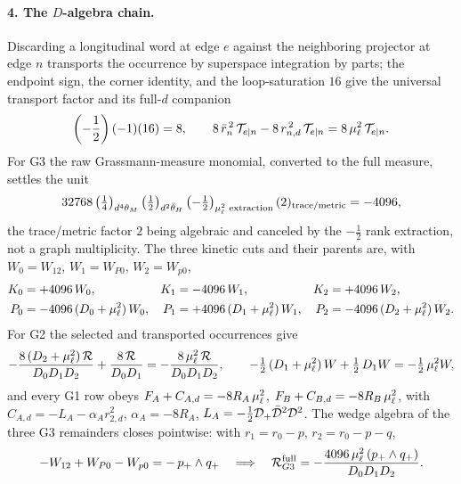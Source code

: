 \paragraph{4. The $D$-algebra chain.} Discarding a longitudinal word at edge $e$ against the neighboring projector at edge $n$ transports the occurrence by superspace integration by parts; the endpoint sign, the corner identity, and the loop-saturation $16$ give the universal transport factor and its full-$d$ companion
\begin{equation}\label{eq:ss:ab:transport}
\left(-\frac12\right)(-1)(16)=8,
\qquad
8\,\bar r_n^{\,2}\,\mathcal T_{e|n}-8\,r_{n,d}^{\,2}\,\mathcal T_{e|n}
=8\,\mu_\ell^{2}\,\mathcal T_{e|n} .
\end{equation}
For G3 the raw Grassmann-measure monomial, converted to the full measure, settles the unit
\begin{equation}\label{eq:ss:ab:unit4096}
32768\left(\tfrac14\right)_{d^{4}\theta_M}
\left(\tfrac12\right)_{d^{2}\bar\theta_H}
\left(-\tfrac12\right)_{\mu_\ell^{2}\text{ extraction}}
(2)_{\text{trace/metric}}=-4096 ,
\end{equation}
the trace/metric factor $2$ being algebraic and canceled by the $-\tfrac12$ rank extraction, not a graph multiplicity. The three kinetic cuts and their parents are, with $W_0=W_{12}$, $W_1=W_{P0}$, $W_2=W_{p0}$,
\begin{align}
K_0&=+4096\,W_0,
&
K_1&=-4096\,W_1,
&
K_2&=+4096\,W_2,
\label{eq:ss:ab:cuts}\\
P_0&=-4096\,(D_0+\mu_\ell^{2})\,W_0,
&
P_1&=+4096\,(D_1+\mu_\ell^{2})\,W_1,
&
P_2&=-4096\,(D_2+\mu_\ell^{2})\,W_2 .
\label{eq:ss:ab:parents}
\end{align}
For G2 the selected and transported occurrences give
\begin{equation}\label{eq:ss:ab:g2pair}
-\frac{8\,(D_2+\mu_\ell^{2})\,\mathcal R}{D_0D_1D_2}
+\frac{8\,\mathcal R}{D_0D_1}
=-\frac{8\,\mu_\ell^{2}\,\mathcal R}{D_0D_1D_2},
\qquad
-\tfrac12\,(D_1+\mu_\ell^{2})\,W+\tfrac12\,D_1W=-\tfrac12\,\mu_\ell^{2}W ,
\end{equation}
and every G1 row obeys $F_A+C_{A,d}=-8R_A\,\mu_\ell^{2}$, $F_B+C_{B,d}=-8R_B\,\mu_\ell^{2}$, with $C_{A,d}=-L_A-\alpha_A r_{2,d}^{2}$, $\alpha_A=-8R_A$, $L_A=-\tfrac12\mathcal{D}_+\bar{\mathcal{D}}^{2}\mathcal{D}^{2}$. The wedge algebra of the three G3 remainders closes pointwise: with $r_1=r_0-p$, $r_2=r_0-p-q$,
\begin{equation}\label{eq:ss:ab:wedge}
-W_{12}+W_{P0}-W_{p0}=-\,p_+\wedge q_+
\quad\Longrightarrow\quad
\mathcal R_{G3}^{\mathrm{full}}
=-\frac{4096\,\mu_\ell^{2}\,(p_+\wedge q_+)}{D_0D_1D_2} .
\end{equation}

